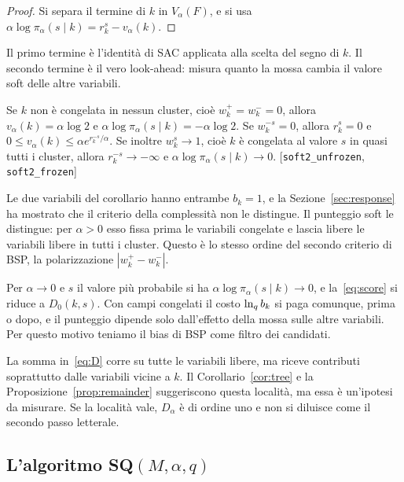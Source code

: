 \begin{proof}
Si separa il termine di $k$ in $V_\alpha(F)$, e si usa $\alpha\log\pi_\alpha(s\mid k)=r_k^s-v_\alpha(k)$.
\end{proof}

Il primo termine è l'identità di SAC applicata alla scelta del segno di $k$.
Il secondo termine è il vero look-ahead: misura quanto la mossa cambia il valore soft delle altre variabili.

\begin{corollario}
\label{cor:frozen-free}
Se $k$ non è congelata in nessun cluster, cioè $w_k^+=w_k^-=0$, allora $v_\alpha(k)=\alpha\log2$ e $\alpha\log\pi_\alpha(s\mid k)=-\alpha\log2$.
Se $w_k^{-s}=0$, allora $r_k^s=0$ e $0\le v_\alpha(k)\le\alpha e^{r_k^{-s}/\alpha}$.
Se inoltre $w_k^s\to1$, cioè $k$ è congelata al valore $s$ in quasi tutti i cluster, allora $r_k^{-s}\to-\infty$ e $\alpha\log\pi_\alpha(s\mid k)\to0$.
[\texttt{soft2\_unfrozen}, \texttt{soft2\_frozen}]
\end{corollario}

Le due variabili del corollario hanno entrambe $b_k=1$, e la Sezione~\ref{sec:response} ha mostrato che il criterio della complessità non le distingue.
Il punteggio soft le distingue: per $\alpha>0$ esso fissa prima le variabili congelate e lascia libere le variabili libere in tutti i cluster.
Questo è lo stesso ordine del secondo criterio di BSP, la polarizzazione $|w_k^+-w_k^-|$.

\begin{osservazione}
\label{oss:cancel}
Per $\alpha\to0$ e $s$ il valore più probabile si ha $\alpha\log\pi_\alpha(s\mid k)\to0$, e la~\eqref{eq:score} si riduce a $D_0(k,s)$.
Con campi congelati il costo $\ln_q b_k$ si paga comunque, prima o dopo, e il punteggio dipende solo dall'effetto della mossa sulle altre variabili.
Per questo motivo teniamo il bias di BSP come filtro dei candidati.
\end{osservazione}

La somma in~\eqref{eq:D} corre su tutte le variabili libere, ma riceve contributi soprattutto dalle variabili vicine a $k$.
Il Corollario~\ref{cor:tree} e la Proposizione~\ref{prop:remainder} suggeriscono questa località, ma essa è un'ipotesi da misurare.
Se la località vale, $D_\alpha$ è di ordine uno e non si diluisce come il secondo passo letterale.

\subsection{L'algoritmo SQ$(M,\alpha,q)$}

